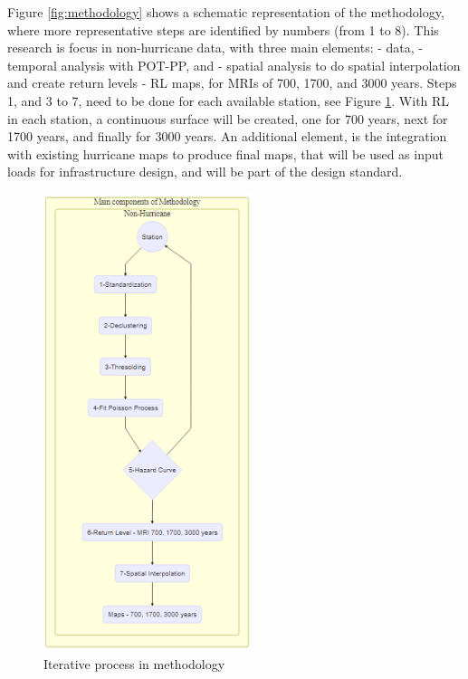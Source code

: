 \documentclass[12pt,oneside]{reedthesis}
\begin{document}
Figure \ref{fig:methodology} shows a schematic representation of the methodology, where more representative steps are identified by numbers (from 1 to 8). This research is focus in non-hurricane data, with three main elements: - data, - temporal analysis with POT-PP, and - spatial analysis to do spatial interpolation and create return levels - RL maps, for MRIs of 700, 1700, and 3000 years. Steps 1, and 3 to 7, need to be done for each available station, see Figure \ref{fig:mainmethodology}. With RL in each station, a continuous surface will be created, one for 700 years, next for 1700 years, and finally for 3000 years. An additional element, is the integration with existing hurricane maps to produce final maps, that will be used as input loads for infrastructure design, and will be part of the design standard.
\begin{figure}

{\centering \includegraphics[width=2.4in]{figure/main_methodology} 

}

\caption{Iterative process in methodology}\label{fig:mainmethodology}
\end{figure}
\end{document}
